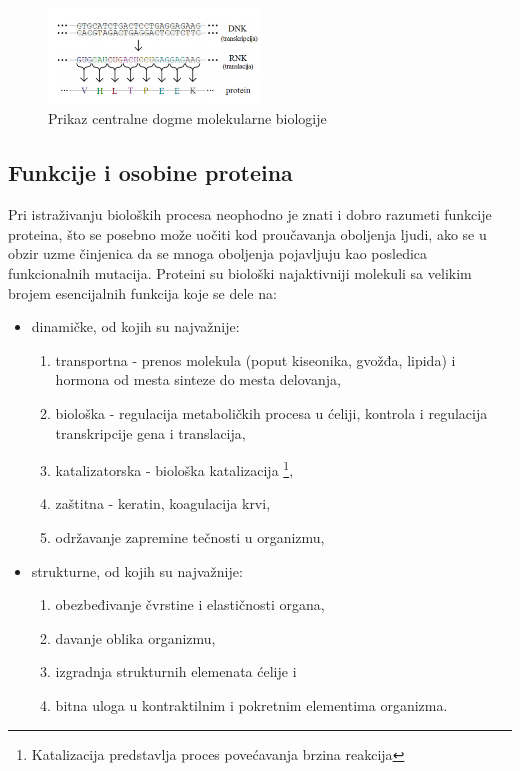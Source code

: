 \begin{figure}[h]
	\centering
    \includegraphics[width=0.5\textwidth]{Figures/BO/dogma.png}
    \caption{Prikaz centralne dogme molekularne biologije~\cite{JKd}}
    \label{fig:dogma}
\end{figure}

\subsection{Funkcije i osobine proteina}
Pri istraživanju bioloških procesa neophodno je znati i dobro razumeti funkcije proteina, što se posebno može uočiti kod proučavanja oboljenja ljudi, ako se u obzir uzme činjenica da se mnoga oboljenja pojavljuju kao posledica funkcionalnih mutacija. Proteini su biološki najaktivniji molekuli sa velikim brojem esencijalnih funkcija koje se dele na:
\begin{itemize}
\item dinamičke, od kojih su najvažnije:
\begin{enumerate} 
\item transportna - prenos molekula (poput kiseonika, gvožđa, lipida) i hormona od mesta sinteze do mesta delovanja,
\item biološka - regulacija metaboličkih procesa u ćeliji, kontrola i regulacija transkripcije gena i translacija,
\item katalizatorska - biološka katalizacija \footnote{Katalizacija predstavlja proces povećavanja brzina reakcija},
\item zaštitna - keratin, koagulacija krvi,
\item održavanje zapremine tečnosti u organizmu,
\end{enumerate}
\item strukturne, od kojih su najvažnije:
\begin{enumerate}
\item obezbeđivanje čvrstine i elastičnosti organa,
\item davanje oblika organizmu,
\item izgradnja strukturnih elemenata ćelije i
\item bitna uloga u kontraktilnim i pokretnim elementima organizma.
\end{enumerate}
\end{itemize} 

